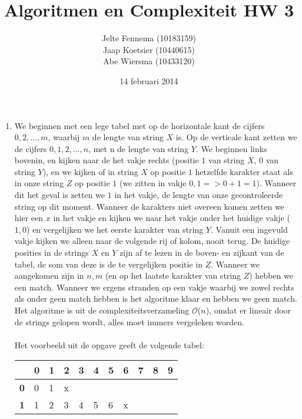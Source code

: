 \documentclass[11pt]{article}
\title{\textbf{Algoritmen en Complexiteit HW 3}}
\author{Jelte Fennema (10183159)\\
		Jaap Koetsier (10440615)\\
        Abe Wiersma (10433120)}
\date{14 februari 2014}
\newcommand{\bigO}{\ensuremath{\mathcal{O}}}
\begin{document}
\maketitle

\begin{enumerate}
    \item We beginnen met een lege tabel met op de horizontale kant de cijfers $0, 2, ..., m$,
    	waarbij $m$ de lengte van string $X$ is. Op de verticale kant zetten we de cijfers
    	$0, 1, 2, ..., n$, met n de lengte van string $Y$. We beginnen links bovenin, en kijken
    	naar de het vakje rechts (positie $1$ van string $X$, $0$ van string $Y$), en we kijken
    	of in string $X$ op positie $1$ hetzelfde karakter staat als in onze string $Z$ op
    	positie $1$ (we zitten in vakje $0, 1 => 0 + 1 = 1$). Wanneer dit het geval is zetten we
    	$1$ in het vakje, de lengte van onze gecontroleerde string op dit moment. Wanneer de
    	karakters niet overeen komen zetten we hier een $x$ in het vakje en kijken
    	we naar het vakje onder het huidige vakje ($1,0$) en vergelijken we het eerste karakter
    	van string $Y$. Vanuit een ingevuld vakje kijken we alleen naar de volgende rij of kolom,
    	nooit terug. De huidige posities in de strings $X$ en $Y$ zijn af te lezen in de boven-
    	en zijkant van de tabel, de som van deze is de te vergelijken positie in $Z$. Wanneer
    	we aangekomen zijn in $n, m$ (en op het laatste karakter van string $Z$) hebben we
    	een match. Wanneer we ergens stranden op een vakje waarbij we zowel rechts als onder
    	geen match hebben is het algoritme klaar en hebben we geen match.\\
    	Het algoritme is uit de complexiteitsverzameling \bigO($n$), omdat er lineair door de
    	strings gelopen wordt, alles moet immers vergeleken worden.\\\\
    	Het voorbeeld uit de opgave geeft de volgende tabel:
		\begin{table}[H]
		\centering
		\begin{tabular}{lllllllllll}
		\hline
				   & \textbf{0} & \textbf{1} & \textbf{2} & \textbf{3} & \textbf{4} & \textbf{5} & \textbf{6} & \textbf{7} & \textbf{8} & \textbf{9} \\ \hline
		\textbf{0} & 0          & 1          & x          &            &            &            &            &            &            &            \\
		\textbf{1} & 1          & 2          & 3          & 4          & 5          & 6          & x          &            &            &            \\

\end{tabular}
\end{table}
\end{enumerate}
\end{document}

